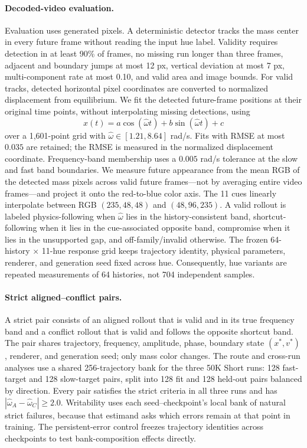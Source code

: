 \paragraph{Decoded-video evaluation.}
Evaluation uses generated pixels.
A deterministic detector tracks the mass center in every future frame without
reading the input hue label. Validity requires detection in at least 90\% of
frames, no missing run longer than three frames, adjacent and boundary jumps at
most 12 px, vertical deviation at most 7 px, multi-component rate at most
0.10, and valid area and image bounds. For valid tracks, detected horizontal
pixel coordinates are converted to normalized displacement from equilibrium. We
fit the detected future-frame positions at their original time points, without
interpolating missing detections, using
\[
x(t)=a\cos(\hat\omega t)+b\sin(\hat\omega t)+c
\]
over a 1,601-point grid with $\hat\omega\in[1.21,8.64]$ rad/s. Fits with RMSE at
most $0.035$ are retained; the RMSE is measured in the normalized displacement
coordinate. Frequency-band membership uses a $0.005$ rad/s tolerance at the slow
and fast band boundaries. We
measure future appearance from the mean RGB of the detected mass pixels across
valid future frames---not by averaging entire video frames---and project it onto
the red-to-blue color axis. The 11 cues linearly interpolate between RGB
$(235,48,48)$ and $(48,96,235)$. A valid
rollout is labeled physics-following when $\hat\omega$ lies in the
history-consistent band, shortcut-following when it lies in the cue-associated
opposite band, compromise when it lies in the unsupported gap, and
off-family/invalid otherwise. The frozen 64-history $\times$ 11-hue
response grid keeps trajectory identity, physical parameters, renderer, and
generation seed fixed across hue. Consequently, hue variants are repeated
measurements of 64 histories, not 704 independent samples.

\paragraph{Strict aligned--conflict pairs.}
A strict pair consists of an aligned rollout that is valid and in its true
frequency band and a conflict rollout that is valid and follows the opposite
shortcut band. The pair shares trajectory, frequency, amplitude, phase,
boundary state $(x^*,v^*)$, renderer, and generation seed; only mass color
changes. The route and cross-run analyses use a shared 256-trajectory bank for
the three 50K Short runs: 128 fast-target and 128 slow-target pairs, split
into 128 fit and 128 held-out pairs balanced by direction. Every pair satisfies
the strict criteria in all three runs and has
$|\hat\omega_A-\hat\omega_C|\ge2.0$. Writability uses each
seed--checkpoint's local bank of natural strict failures, because that estimand
asks which errors remain at that point in training. The persistent-error control
freezes trajectory identities across checkpoints to test bank-composition
effects directly.

